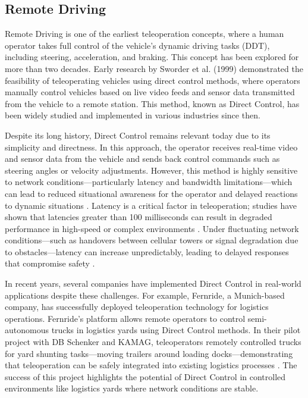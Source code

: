 \subsection{Remote Driving}
Remote Driving is one of the earliest teleoperation concepts,
where a human operator takes full control of the vehicle's
dynamic driving tasks (DDT), including steering, acceleration,
and braking. This concept has been explored for more than two decades.
Early research by Sworder et al. \cite{sworder1999performance} (1999) demonstrated the feasibility
of teleoperating vehicles using direct control methods, where
operators manually control vehicles based on live video feeds and
sensor data transmitted from the vehicle to a remote station.
This method, known as Direct Control, has been widely studied
and implemented in various industries since then.

Despite its long history, Direct Control remains relevant
today due to its simplicity and directness. In this approach,
the operator receives real-time video and sensor data from the
vehicle and sends back control commands such as steering angles
or velocity adjustments. However, this method is highly sensitive
to network conditions—particularly latency and bandwidth
limitations—which can lead to reduced situational awareness for
the operator and delayed reactions to dynamic situations \cite{Gnatzig}.
Latency is a critical factor in teleoperation; studies have shown
that latencies greater than 100 milliseconds can result in degraded
performance in high-speed or complex environments \cite{chucholowski2014teleoperated}.
Under fluctuating network conditions—such as handovers
between cellular towers or signal degradation due to obstacles—latency
can increase unpredictably, leading to delayed responses that
compromise safety \cite{neumeier2023feasibility}.

In recent years, several companies have implemented Direct Control
in real-world applications despite these challenges. For example,
Fernride, a Munich-based company, has successfully deployed
teleoperation technology for logistics operations. Fernride's
platform allows remote operators to control semi-autonomous
trucks in logistics yards using Direct Control methods.
In their pilot project with DB Schenker and KAMAG,
teleoperators remotely controlled trucks for yard shunting
tasks—moving trailers around loading docks—demonstrating that
teleoperation can be safely integrated into existing logistics
processes \cite{fernride2023}. The success of this project
highlights the potential of Direct Control in controlled
environments like logistics yards where network conditions are stable.

